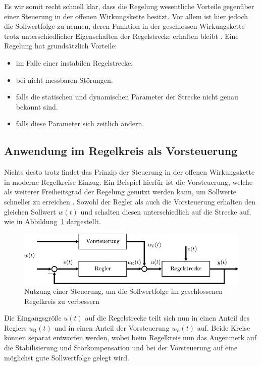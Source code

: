 %
Es wir somit recht schnell klar, dass die Regelung wesentliche Vorteile gegenüber einer Steuerung in der offenen Wirkungskette besitzt. Vor allem ist hier jedoch die Sollwertfolge zu nennen, deren Funktion in der geschlossen Wirkungskette trotz unterschiedlicher Eigenschaften der Regelstrecke erhalten bleibt \cite{Lunze10}. Eine Regelung hat grundsätzlich Vorteile:
%
\begin{itemize}
	\item im Falle einer instabilen Regelstrecke.
	\item bei nicht messbaren Störungen. 
	\item falls die statischen und dynamischen Parameter der Strecke nicht genau bekannt sind.
	\item falls diese Parameter sich zeitlich ändern.
\end{itemize} 
%
\subsection{Anwendung im Regelkreis als Vorsteuerung}
%
Nichts desto trotz findet das Prinzip der Steuerung in der offenen Wirkungskette in moderne Regelkreise Einzug. Ein Beispiel hierfür ist die Vorsteuerung, welche als weiterer Freiheitsgrad der Regelung genutzt werden kann, um Sollwerte schneller zu erreichen \cite{Lunze10}. Sowohl der Regler als auch die Vorsteuerung erhalten den gleichen Sollwert $w(t)$ und schalten diesen unterschiedlich auf die Strecke auf, wie in Abbildung~\ref{fig:vorsteuerung} dargestellt.
%
\begin{figure}[h]
	\centering
	\includegraphics[width=0.95\linewidth]{Abbildungen/Grundbegriffe/PDF/Vorsteuerung.pdf}
	\caption{Nutzung einer Steuerung, um die Sollwertfolge im geschlossenen Regelkreis zu verbessern}
	\label{fig:vorsteuerung}
\end{figure}
%
Die Eingangsgröße $u(t)$ auf die Regelstrecke teilt sich nun in einen Anteil des Reglers $u_{\text{R}}(t)$ und in einen Anteil der Vorsteuerung $u_{\text{V}}(t)$ auf.
%
Beide Kreise können separat entworfen werden, wobei beim Regelkreis nun das Augenmerk auf die Stabilisierung und Störkompensation und bei der Vorsteuerung auf eine möglichst gute Sollwertfolge gelegt wird.\\

